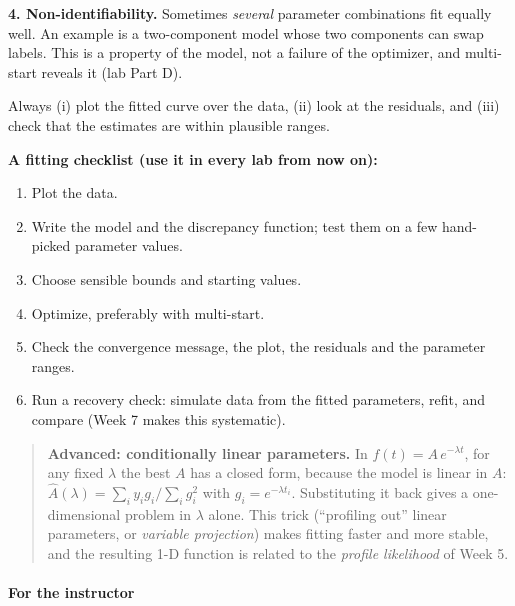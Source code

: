 \textbf{4. Non-identifiability.} Sometimes \emph{several} parameter
combinations fit equally well. An example is a two-component model whose
two components can swap labels. This is a property of the model, not a
failure of the optimizer, and multi-start reveals it (lab Part D).

Always (i) plot the fitted curve over the data, (ii) look at the
residuals, and (iii) check that the estimates are within plausible
ranges.

\textbf{A fitting checklist (use it in every lab from now on):}

\begin{enumerate}
\def\labelenumi{\arabic{enumi}.}
\tightlist
\item
  Plot the data.
\item
  Write the model and the discrepancy function; test them on a few
  hand-picked parameter values.
\item
  Choose sensible bounds and starting values.
\item
  Optimize, preferably with multi-start.
\item
  Check the convergence message, the plot, the residuals and the
  parameter ranges.
\item
  Run a recovery check: simulate data from the fitted parameters, refit,
  and compare (Week 7 makes this systematic).
\end{enumerate}

\begin{quote}
\textbf{Advanced: conditionally linear parameters.} In
\(f(t) = A\,e^{-\lambda t}\), for any fixed \(\lambda\) the best \(A\)
has a closed form, because the model is linear in \(A\):
\(\hat A(\lambda) = \sum_i y_i g_i / \sum_i g_i^2\) with
\(g_i = e^{-\lambda t_i}\). Substituting it back gives a one-dimensional
problem in \(\lambda\) alone. This trick (``profiling out'' linear
parameters, or \emph{variable projection}) makes fitting faster and more
stable, and the resulting 1-D function is related to the \emph{profile
likelihood} of Week 5.
\end{quote}

\paragraph{For the instructor}

